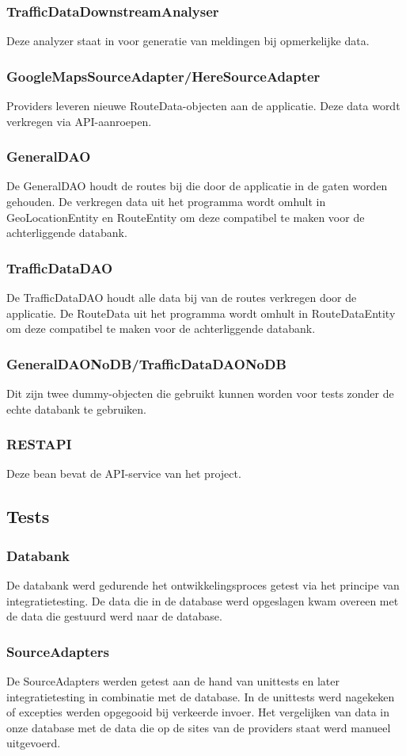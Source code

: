 \documentclass[ps,a4paper,oneside]{report}
\begin{document}
\subsubsection{TrafficDataDownstreamAnalyser}
Deze analyzer staat in voor generatie van meldingen bij opmerkelijke data.
\subsubsection{GoogleMapsSourceAdapter/HereSourceAdapter}
Providers leveren nieuwe RouteData-objecten aan de applicatie. Deze data wordt verkregen via API-aanroepen.
\subsubsection{GeneralDAO}
De GeneralDAO houdt de routes bij die door de applicatie in de gaten worden gehouden. De verkregen data uit het programma wordt omhult in GeoLocationEntity en RouteEntity om deze compatibel te maken voor de achterliggende databank.
\subsubsection{TrafficDataDAO}
De TrafficDataDAO houdt alle data bij van de routes verkregen door de applicatie. De RouteData uit het programma wordt omhult in RouteDataEntity om deze compatibel te maken voor de achterliggende databank.
\subsubsection{GeneralDAONoDB/TrafficDataDAONoDB}
Dit zijn twee dummy-objecten die gebruikt kunnen worden voor tests zonder de echte databank te gebruiken.
\subsubsection{RESTAPI}
Deze bean bevat de API-service van het project.
\subsection{Tests}
\subsubsection{Databank}
De databank werd gedurende het ontwikkelingsproces getest via het principe van integratietesting. De data die in de database werd opgeslagen kwam overeen met de data die gestuurd werd naar de database.
\subsubsection{SourceAdapters}
De SourceAdapters werden getest aan de hand van unittests en later integratietesting in combinatie met de database. In de unittests werd nagekeken of excepties werden opgegooid bij verkeerde invoer. Het vergelijken van data in onze database met de data die op de sites van de providers staat werd manueel uitgevoerd.
\end{document}
